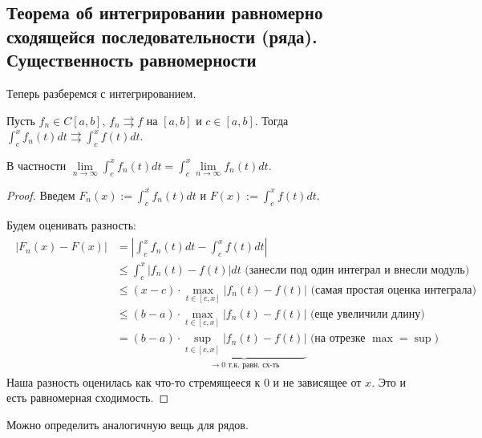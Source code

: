 \subsection{Теорема об интегрировании равномерно сходящейся последовательности (ряда). Существенность равномерности}
Теперь разберемся с интегрированием.

\begin{theorem}
    Пусть $f_n \in C[a, b]$, $f_n \rightrightarrows f$ на $[a, b]$ и $c \in [a, b]$. 
    Тогда $\int_c^x f_n(t)dt \rightrightarrows \int_c^x f(t)dt$.

    В частности $\lim\limits_{n \to \infty} \int_c^x f_n(t)dt = \int_c^x \lim\limits_{n \to \infty} f_n(t)dt$.
\end{theorem}

\begin{proof}
    Введем $F_n(x) := \int_c^x f_n(t)dt$ и $F(x) := \int_c^x f(t)dt $. 
    
    \quad Будем оценивать разность:
    \begin{gather*}
        \begin{split}
            |F_n(x) - F(x)| &= \left|\int_c^x f_n(t)dt - \int_c^x f(t)dt \right| \\
            &\leqslant \int_c^x |f_n(t) - f(t)|dt \text{ (занесли под один интеграл и внесли модуль) } \\
            &\leqslant (x - c) \cdot \max_{t \in [c, x]} |f_n(t) - f(t)| \text{ (самая простая оценка интеграла) } \\
            &\leqslant (b - a) \cdot \max_{t \in [c, x]} |f_n(t) - f(t)| \text{ (еще увеличили длину) }\\
            &= (b - a) \cdot \underbrace{\sup_{t \in [c, x]} |f_n(t) - f(t)|}_{\to 0 \text{ т.к. равн. сх-ть}} \text{ (на отрезке $\max = \sup$) }
        \end{split}
    \end{gather*}
    Наша разность оценилась как что-то стремящееся к 0 и не зависящее от $x$. Это и есть равномерная сходимость.
\end{proof}

\vspace*{7mm}

Можно определить аналогичную вещь для рядов.

